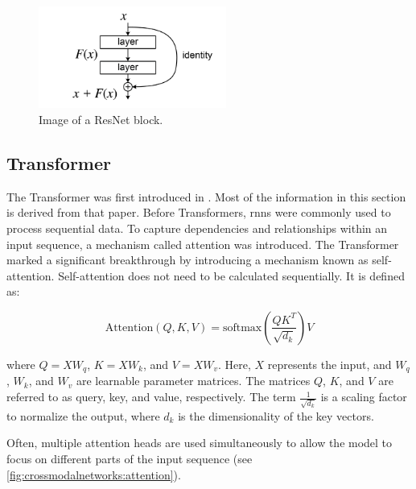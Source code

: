     \begin{figure}[h]
        \centering
        \includegraphics[width=0.55\textwidth]{Images/crossmodalnetworks/ResBlock.png}
        \caption{Image of a ResNet block.\cite{resnetpaper}}
        \label{fig:crossmodalnetworks:resblock}
    \end{figure}

    \subsection{Transformer}

    The Transformer was first introduced in \cite{attentionisallyouneed}.
    Most of the information in this section is derived from that paper. 
    Before Transformers, \acrfull{rnn}s were commonly used to process sequential data. 
    To capture dependencies and relationships within an input sequence, a mechanism called attention was introduced.
    The Transformer marked a significant breakthrough by introducing a mechanism known as self-attention.
    Self-attention does not need to be calculated sequentially.
    It is defined as:

    \begin{equation}
        \text{Attention}(Q, K, V) = \text{softmax}\left(\frac{QK^T}{\sqrt{d_k}}\right)V
        \label{equ:selfattention}
    \end{equation}

    where \(Q = XW_q\), \(K = XW_k\), and \(V = XW_v\). 
    Here, \(X\) represents the input, and \(W_{q}\), \(W_{k}\), and \(W_{v}\) are learnable parameter matrices. 
    The matrices \(Q\), \(K\), and \(V\) are referred to as query, key, and value, respectively. 
    The term \(\frac{1}{\sqrt{d_k}}\) is a scaling factor to normalize the output, where \(d_k\) is the dimensionality of the key vectors.
    
    Often, multiple attention heads are used simultaneously to allow the model to focus on different parts of the input sequence (see \cref{fig:crossmodalnetworks:attention}).
    
